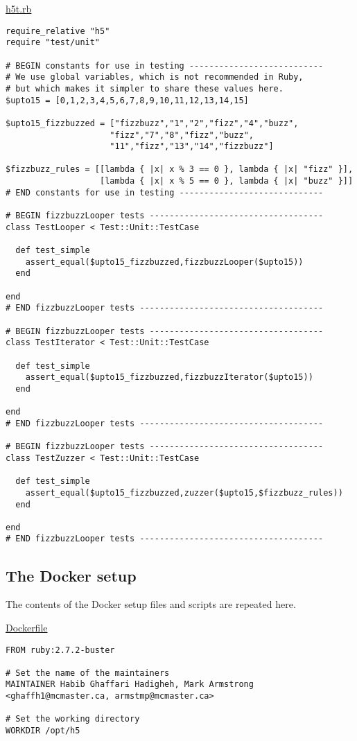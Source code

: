 \documentclass[11pt]{article}
\begin{document}
\href{./testing/h5/h5t.rb}{h5t.rb}
\begin{verbatim}
require_relative "h5"
require "test/unit"

# BEGIN constants for use in testing ---------------------------
# We use global variables, which is not recommended in Ruby,
# but which makes it simpler to share these values here.
$upto15 = [0,1,2,3,4,5,6,7,8,9,10,11,12,13,14,15]

$upto15_fizzbuzzed = ["fizzbuzz","1","2","fizz","4","buzz",
                     "fizz","7","8","fizz","buzz",
                     "11","fizz","13","14","fizzbuzz"]

$fizzbuzz_rules = [[lambda { |x| x % 3 == 0 }, lambda { |x| "fizz" }],
                   [lambda { |x| x % 5 == 0 }, lambda { |x| "buzz" }]]
# END constants for use in testing -----------------------------

# BEGIN fizzbuzzLooper tests -----------------------------------
class TestLooper < Test::Unit::TestCase

  def test_simple
    assert_equal($upto15_fizzbuzzed,fizzbuzzLooper($upto15))
  end

end
# END fizzbuzzLooper tests -------------------------------------

# BEGIN fizzbuzzLooper tests -----------------------------------
class TestIterator < Test::Unit::TestCase

  def test_simple
    assert_equal($upto15_fizzbuzzed,fizzbuzzIterator($upto15))
  end

end
# END fizzbuzzLooper tests -------------------------------------

# BEGIN fizzbuzzLooper tests -----------------------------------
class TestZuzzer < Test::Unit::TestCase

  def test_simple
    assert_equal($upto15_fizzbuzzed,zuzzer($upto15,$fizzbuzz_rules))
  end

end
# END fizzbuzzLooper tests -------------------------------------
\end{verbatim}

\subsection*{The Docker setup}
\label{sec:org1d441c6}
The contents of the Docker setup files and scripts are repeated here.

\href{./testing/h5/Dockerfile}{Dockerfile}
\begin{verbatim}
FROM ruby:2.7.2-buster

# Set the name of the maintainers
MAINTAINER Habib Ghaffari Hadigheh, Mark Armstrong <ghaffh1@mcmaster.ca, armstmp@mcmaster.ca>

# Set the working directory
WORKDIR /opt/h5
\end{verbatim}
\end{document}
